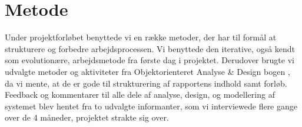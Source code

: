 \chapter{Metode}
\label{chap:metode}
Under projektforløbet benyttede vi  en række metoder, der har til formål at strukturere og forbedre arbejdsprocessen. Vi benyttede den iterative, også kendt som evolutionære, arbejdsmetode fra første dag i projektet. Derudover brugte vi udvalgte metoder og aktiviteter fra Objektorienteret Analyse \& Design bogen \cite{ooad}, da vi mente, at de er gode til strukturering af rapportens indhold samt forløb. Feedback og kommentarer til alle dele af analyse, design, og modellering af systemet blev hentet fra to udvalgte informanter, som vi interviewede flere gange over de 4 måneder, projektet strakte sig over.








